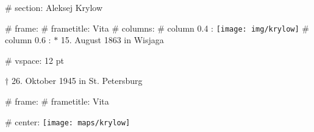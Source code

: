 # section: Aleksej Krylow

# frame:
  # frametitle: Vita
  # columns:
    # column {0.4 \textwidth}:
      \texttt{[image: img/krylow]}
    # column {0.6 \textwidth}:
      $*$ 15. August 1863 in Wisjaga

      # vspace: 12 pt

      $\dagger$ 26. Oktober 1945 in St. Petersburg

# frame:
  # frametitle: Vita

  # center:
    \texttt{[image: maps/krylow]}
